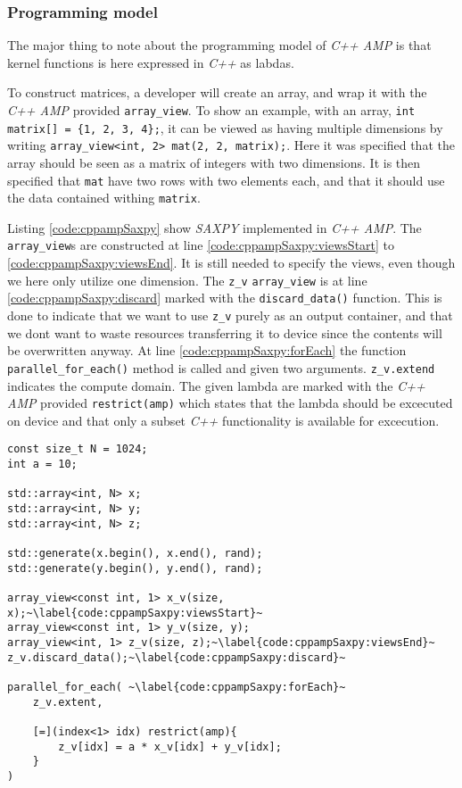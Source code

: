 \subsubsection{Programming model}
The major thing to note about the programming model of \textit{C++ AMP} is that kernel functions is here expressed in \textit{C++} as labdas. 

To construct matrices, a developer will create an array, and wrap it with the \textit{C++ AMP} provided \texttt{array\_view}. To show an example, with an array, \texttt{int matrix[] = \{1, 2, 3, 4\};}, it can be viewed as having multiple dimensions by writing \texttt{array\_view<int, 2> mat(2, 2, matrix);}. Here it was specified that the array should be seen as a matrix of integers with two dimensions. It is then specified that \texttt{mat} have two rows with two elements each, and that it should use the data contained withing \texttt{matrix}.

Listing \ref{code:cppampSaxpy} show \textit{SAXPY} implemented in \textit{C++ AMP}. The \texttt{array\_view}s are constructed at line \ref{code:cppampSaxpy:viewsStart} to \ref{code:cppampSaxpy:viewsEnd}. It is still needed to specify the views, even though we here only utilize one dimension. The \texttt{z\_v} \texttt{array\_view} is at line \ref{code:cppampSaxpy:discard} marked with the \texttt{discard\_data()} function. This is done to indicate that we want to use \texttt{z\_v} purely as an output container, and that we dont want to waste resources transferring it to device since the contents will be overwritten anyway.
At line \ref{code:cppampSaxpy:forEach} the function \texttt{parallel\_for\_each()} method is called and given two arguments. \texttt{z\_v.extend} indicates the compute domain. The given lambda are marked with the \textit{C++ AMP} provided \texttt{restrict(amp)} which states that the lambda should be excecuted on device and that only a subset \textit{C++} functionality is available for excecution.
\begin{lstlisting}[caption={\textit{C++ AMP} \textit{SAXPY} example.}, label={code:cppampSaxpy}]
const size_t N = 1024;
int a = 10;

std::array<int, N> x;
std::array<int, N> y;
std::array<int, N> z;

std::generate(x.begin(), x.end(), rand);
std::generate(y.begin(), y.end(), rand);

array_view<const int, 1> x_v(size, x);~\label{code:cppampSaxpy:viewsStart}~
array_view<const int, 1> y_v(size, y);
array_view<int, 1> z_v(size, z);~\label{code:cppampSaxpy:viewsEnd}~
z_v.discard_data();~\label{code:cppampSaxpy:discard}~

parallel_for_each( ~\label{code:cppampSaxpy:forEach}~
    z_v.extent,

    [=](index<1> idx) restrict(amp){
        z_v[idx] = a * x_v[idx] + y_v[idx];
    }
)
\end{lstlisting}

